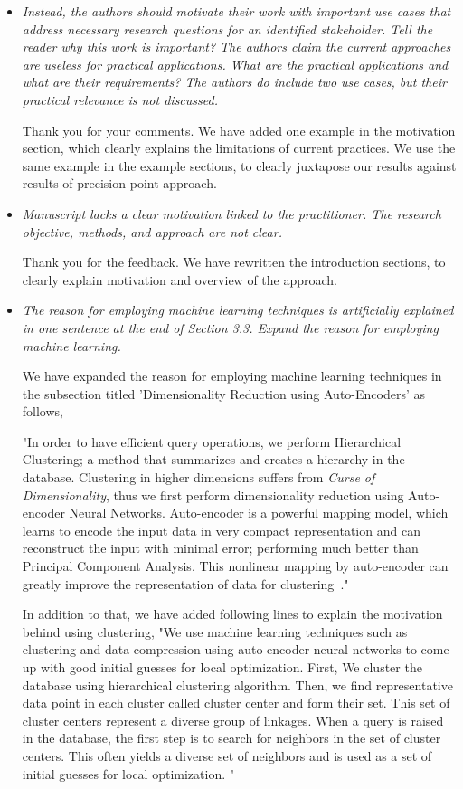 \documentclass{article}
\begin{document}
\begin{itemize}
  \item \emph{
Instead, the authors should motivate their work with important use cases that address necessary research questions for an identified stakeholder. Tell the reader why this work is important? The authors claim the current approaches are useless for practical applications. What are the practical applications and what are their requirements? The authors do include two use cases, but their practical relevance is not discussed.
}

Thank you for your comments.
We have added one example in the motivation section, which clearly explains the limitations of current practices.
We use the same example in the example sections, to clearly juxtapose our results against results of precision point approach.
\\

  \item \emph{
Manuscript lacks a clear motivation linked to the practitioner.
The research objective, methods, and approach are not clear.
}

Thank you for the feedback.
We have rewritten the introduction sections, to clearly explain motivation and overview of the approach.
\\

  \item \emph{
 The reason for employing machine learning techniques is artificially explained in one sentence at the end of Section 3.3. Expand the reason for employing machine learning.
}

We have expanded the reason for employing machine learning techniques in the subsection titled 'Dimensionality Reduction using Auto-Encoders' as follows,

"In order to have efficient query operations, we perform Hierarchical Clustering; a method that summarizes and creates a hierarchy in the database.
Clustering in higher dimensions suffers from \emph{Curse of Dimensionality}\cite{marimont1979}, thus we first perform dimensionality reduction using Auto-encoder Neural Networks.
Auto-encoder is a powerful mapping model, which learns to encode the input data in very compact representation and can reconstruct the input with minimal error; performing much better than Principal Component Analysis\cite{hinton2006}.
This nonlinear mapping by auto-encoder can greatly improve the representation of data for clustering~\cite{song2013}."

In addition to that, we have added following lines to explain the motivation behind using clustering,
"We use machine learning techniques such as clustering and data-compression using auto-encoder neural networks to come up with good initial guesses for local optimization.
First, We cluster the database using hierarchical clustering algorithm.
Then, we find representative data point in each cluster called cluster center and form their set.
This set of cluster centers represent a diverse group of linkages.
When a query is raised in the database, the first step is to search for neighbors in the set of cluster centers.
This often yields a diverse set of neighbors and is used as a set of initial guesses for local optimization.
"
\\


\end{itemize}
\end{document}
